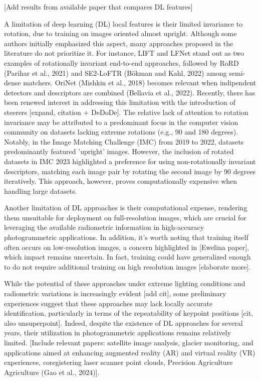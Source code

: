 [Add results from available paper that compares DL features] 

A limitation of deep learning (DL) local features is their limited invariance to rotation, due to training on images oriented almost upright. Although some authors initially emphasized this aspect, many approaches proposed in the literature do not prioritize it. For instance, LIFT and LFNet stand out as two examples of rotationally invariant end-to-end approaches, followed by RoRD (Parihar et al., 2021) and SE2-LoFTR (Bökman and Kahl, 2022) among semi-dense matchers. OriNet (Mishkin et al., 2018) becomes relevant when indipendent detectors and descriptors are combined (Bellavia et al., 2022). Recently, there has been renewed interest in addressing this limitation with the introduction of steerers [expand, citation + DeDoDe]. The relative lack of attention to rotation invariance may be attributed to a predominant focus in the computer vision community on datasets lacking extreme rotations (e.g., 90 and 180 degrees). Notably, in the Image Matching Challenge (IMC) from 2019 to 2022, datasets predominantly featured 'upright' images. However, the inclusion of rotated datasets in IMC 2023 highlighted a preference for using non-rotationally invariant descriptors, matching each image pair by rotating the second image by 90 degrees iteratively. This approach, however, proves computationally expensive when handling large datasets. 

Another limitation of DL approaches is their computational expense, rendering them unsuitable for deployment on full-resolution images, which are crucial for leveraging the available radiometric information in high-accuracy photogrammetric applications. In addition, it's worth noting that training itself often occurs on low-resolution images, a concern highlighted in [Ewelina paper], which impact remains uncertain. In fact, training could have generalized enough to do not require additional training on high resolution images [elaborate more]. 

While the potential of these approaches under extreme lighting conditions and radiometric variations is increasingly evident [add cit], some preliminary experiences suggest that these approaches may lack locally accurate identification, particularly in terms of the repeatability of keypoint positions [cit, also unsuperpoint]. 
Indeed, despite the existence of DL approaches for several years, their utilization in photogrammetric applications remains relatively limited. [Include relevant papers: satellite image analysis, glacier monitoring, and applications aimed at enhancing augmented reality (AR) and virtual reality (VR) experiences, coregistering laser scanner point clouds, Precision Agriculture Agriculture (Gao et al., 2024)]. 

